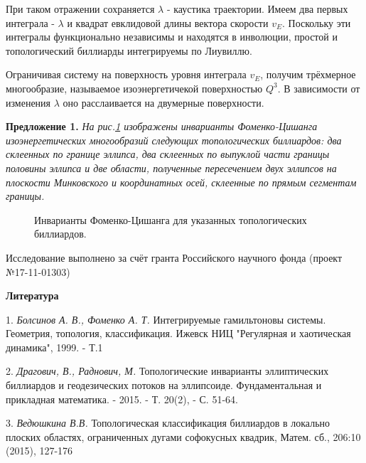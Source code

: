 

При таком отражении сохраняется $\lambda$ - каустика траектории. Имеем два первых интеграла - $\lambda$ и квадрат евклидовой длины вектора скорости $v_E$. Поскольку эти интегралы функционально независимы и находятся в инволюции, простой и топологический биллиарды интегрируемы по Лиувиллю.

Ограничивая систему на поверхность уровня интеграла $v_E$, получим трёхмерное многообразие, называемое изоэнергетичекой поверхностью $Q^3$. В зависимости от изменения $\lambda$ оно расслаивается на двумерные поверхности.


\textbf{Предложение 1.} {\it На рис.\ref{ex} изображены инварианты Фо\-ме\-н\-ко-Ци\-ша\-н\-га изоэнергетических многообразий следующих топологических биллиардов: два склеенных по границе эллипса, два склеенных по выпуклой части границы половины эллипса и две области, полученные пересечением двух эллипсов на плоскости Минковского и координатных осей, склеенные по прямым сегментам границы.}

\begin{figure}[h!]
		\vspace*{-0.8 cm}
		\caption{Инварианты Фоменко-Цишанга для указанных топологических биллиардов.}
		\label{ex}
	\end{figure}

Исследование выполнено за счёт гранта Российского научного фонда (проект №17-11-01303)

\smallskip \centerline{\bf Литература} \nopagebreak

1. {\it Болсинов А. В., Фоменко А. Т.} Интегрируемые гамильтоновы системы. Геометрия, топология, классификация.  Ижевск НИЦ "Регулярная и хаотическая динамика", 1999. - Т.1


2. {\it Драгович, В., Раднович, М.} Топологические инварианты эллиптических биллиардов и геодезических потоков на эллипсоиде. Фундаментальная и прикладная математика. - 2015. - Т. 20(2), -  С. 51-64.

3. {\it Ведюшкина В.В.} Топологическая классификация биллиардов в локально плоских областях,
ограниченных дугами софокусных квадрик, Матем. сб., 206:10 (2015), 127-176

